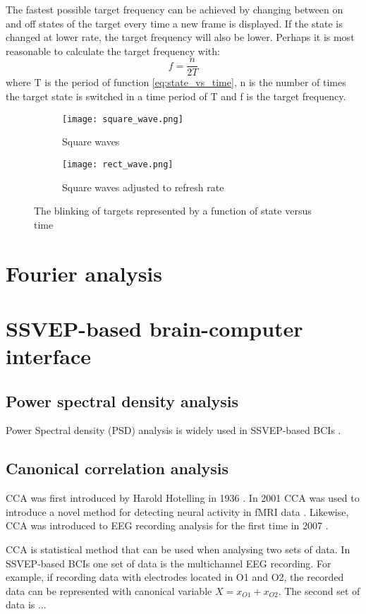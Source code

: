 The fastest possible target frequency can be achieved by changing between on and off states of the target every time a new frame is displayed. If the state is changed at lower rate, the target frequency will also be lower. Perhaps it is most reasonable to calculate the target frequency with:
\begin{equation}
	f = \frac{n}{2T}
\end{equation}
where T is the period of function \ref{eq:state_vs_time}, n is the number of times the target state is switched in a time period of T and f is the target frequency.

\begin{figure}[h!]
	\centering
	\begin{subfigure}{\textwidth}
		\texttt{[image: square\_wave.png]}
		\caption{Square waves}
		\label{fig:rain_lobes}
	\end{subfigure}\vspace{30pt}
	\begin{subfigure}{\textwidth}
		\texttt{[image: rect\_wave.png]}
		\caption{Square waves adjusted to refresh rate}
		\label{fig:isual_pathway}
	\end{subfigure}
	\caption{The blinking of targets represented by a function of state versus time}
	\label{fig:obes_pathway}
\end{figure}

\section{Fourier analysis}



\section{SSVEP-based brain-computer interface}
\label{sec:SSVEP_detection}

\subsection{Power spectral density analysis}

Power Spectral density (PSD) analysis is widely used in \gls{SSVEP}-based \glspl{BCI} \cite{bin2009cca}.

\subsection{Canonical correlation analysis}

\Gls{CCA} was first introduced by Harold Hotelling in 1936 \cite{cca_hotelling}. In 2001 \gls{CCA} was used to introduce a novel method for detecting neural activity in \gls{fMRI} data \cite{cca_fmri}. Likewise, \gls{CCA} was introduced to \gls{EEG} recording analysis for the first time in 2007 \cite{cca_eeg_lin}. 

\Gls{CCA} is statistical method that can be used when analysing two sets of data. In \gls{SSVEP}-based \glspl{BCI} one set of data is the multichannel \gls{EEG} recording. For example, if recording data with electrodes located in O1 and O2, the recorded data can be represented with canonical variable $X=x_{O1}+x_{O2}$. The second set of data is ...
